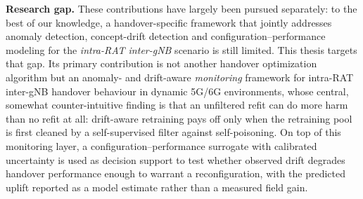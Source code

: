 \textbf{Research gap.} These contributions have largely been pursued separately:
to the best of our knowledge, a handover-specific framework that jointly
addresses anomaly detection, concept-drift detection and
configuration--performance modeling for the \emph{intra-RAT inter-gNB} scenario
is still limited. This thesis targets that gap. Its primary contribution is not
another handover optimization algorithm but an anomaly- and drift-aware
\emph{monitoring} framework for intra-RAT inter-gNB handover behaviour in dynamic
5G/6G environments, whose central, somewhat counter-intuitive finding is that
an unfiltered refit can do more harm than no refit at all: drift-aware
retraining pays off only when the retraining pool is first cleaned by a
self-supervised filter against self-poisoning. On top of this
monitoring layer, a configuration--performance surrogate with calibrated
uncertainty is used as decision support to test whether observed drift degrades
handover performance enough to warrant a reconfiguration, with the predicted
uplift reported as a model estimate rather than a measured field gain.
